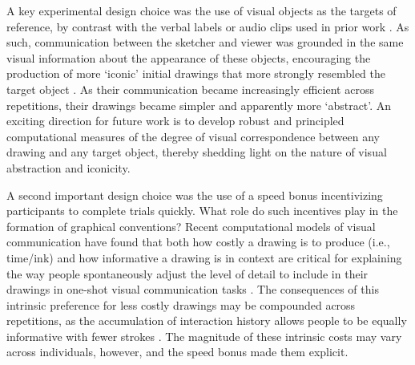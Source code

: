\documentclass[11pt,letterpaper]{article}
\begin{document}
A key experimental design choice was the use of visual objects as the targets of reference, by contrast with the verbal labels or audio clips used in prior work \cite{GalantucciGarrod11_ExperimentalSemiotics,fay2010interactive}. %
As such, communication between the sketcher and viewer was grounded in the same visual information about the appearance of these objects, encouraging the production of more `iconic' initial drawings that more strongly resembled the target object \cite{verhoef2016iconicity,perlman2015iconicity}.
As their communication became increasingly efficient across repetitions, their drawings became simpler and apparently more `abstract'.
An exciting direction for future work is to develop robust and principled computational measures of the degree of visual correspondence between any drawing and any target object, thereby shedding light on the nature of visual abstraction and iconicity.

A second important design choice was the use of a speed bonus incentivizing participants to complete trials quickly.
What role do such incentives play in the formation of graphical conventions?
Recent computational models of visual communication have found that both how costly a drawing is to produce (i.e., time/ink) and how informative a drawing is in context are critical for explaining the way people spontaneously adjust the level of detail to include in their drawings in one-shot visual communication tasks \cite{fan2020pragmatic}.
The consequences of this intrinsic preference for less costly drawings may be compounded across repetitions, as the accumulation of interaction history allows people to be equally informative with fewer strokes \cite{HawkinsFrankGoodman17_ConventionFormation}.
The magnitude of these intrinsic costs may vary across individuals, however, and the speed bonus made them explicit.

\end{document}
